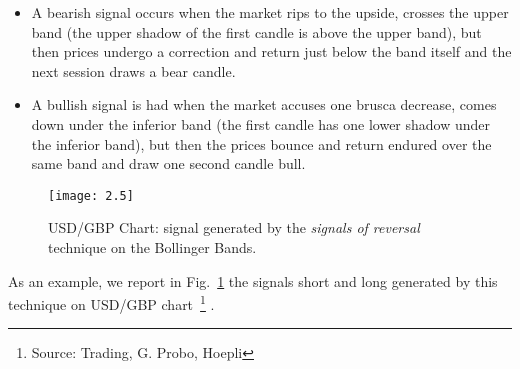 \begin{itemize}
\setlength\itemsep{0.3em}
\item A bearish signal occurs when the market rips to the upside, crosses the upper band (the upper shadow of the first candle is above the upper band), but then prices undergo a correction and return just below the band itself and the next session draws a bear candle. 
\item A bullish signal is had when the market accuses one brusca decrease, comes down under the inferior band (the first candle has one lower shadow under the inferior band), but then the prices bounce and return endured over the same band and draw one second candle bull. 
\end{itemize} 

\begin{figure}[h]
\texttt{[image: 2.5]}
\centering
\caption{USD/GBP Chart: signal generated by the \textit{signals of reversal} technique on the Bollinger Bands.}
\label{fig:25} 
\end{figure}

As an example, we report in Fig.~\ref{fig:25} the signals short and long generated by this technique on USD/GBP chart~\footnote{Source: Trading, G. Probo, Hoepli} .


